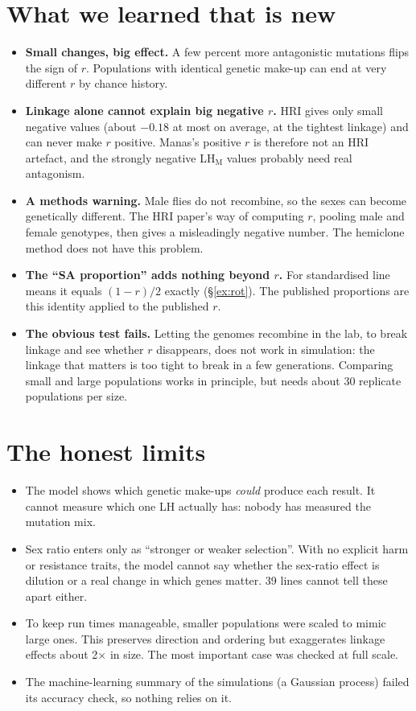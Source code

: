 \section{What we learned that is new}
\begin{itemize}
\item \textbf{Small changes, big effect.} A few percent more antagonistic mutations flips the sign of $r$. Populations with identical genetic make-up can end at very different $r$ by chance history.
\item \textbf{Linkage alone cannot explain big negative $r$.} HRI gives only small negative values (about $-0.18$ at most on average, at the tightest linkage) and can never make $r$ positive. Manas's positive $r$ is therefore not an HRI artefact, and the strongly negative LH$_\mathrm{M}$ values probably need real antagonism.
\item \textbf{A methods warning.} Male flies do not recombine, so the sexes can become genetically different. The HRI paper's way of computing $r$, pooling male and female genotypes, then gives a misleadingly negative number. The hemiclone method does not have this problem.
\item \textbf{The ``SA proportion'' adds nothing beyond $r$.} For standardised line means it equals $(1-r)/2$ exactly (\S\ref{ex:rot}). The published proportions are this identity applied to the published $r$.
\item \textbf{The obvious test fails.} Letting the genomes recombine in the lab, to break linkage and see whether $r$ disappears, does not work in simulation: the linkage that matters is too tight to break in a few generations. Comparing small and large populations works in principle, but needs about 30 replicate populations per size.
\end{itemize}

\section{The honest limits}
\begin{itemize}
\item The model shows which genetic make-ups \emph{could} produce each result. It cannot measure which one LH actually has: nobody has measured the mutation mix.
\item Sex ratio enters only as ``stronger or weaker selection''. With no explicit harm or resistance traits, the model cannot say whether the sex-ratio effect is dilution or a real change in which genes matter. 39 lines cannot tell these apart either.
\item To keep run times manageable, smaller populations were scaled to mimic large ones. This preserves direction and ordering but exaggerates linkage effects about 2$\times$ in size. The most important case was checked at full scale.
\item The machine-learning summary of the simulations (a Gaussian process) failed its accuracy check, so nothing relies on it.
\end{itemize}

